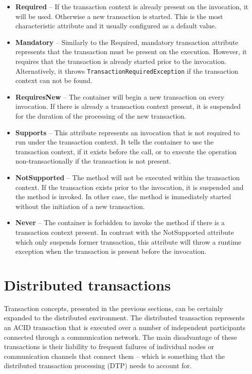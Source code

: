 \documentclass[oneside,
  digital, %
  table,   %
  nolof,     %
  nolot,     %
]{fithesis3}
\begin{document}
\begin{itemize}
    \item \textbf{Required} -- If the transaction context is already present on the invocation, it will be used. Otherwise a new transaction is started. This is the most characteristic attribute and it usually configured as a default value.
    
    \item \textbf{Mandatory} -- Similarly to the Required, mandatory transaction attribute represents that the transaction must be present on the execution. However, it requires that the transaction is already started prior to the invocation. Alternatively, it throws \texttt{TransactionRequiredException} if the transaction context can not be found.
    
    \item \textbf{RequiresNew} -- The container will begin a new transaction on every invocation. If there is already a transaction context present, it is suspended for the duration of the processing of the new transaction. 
    
    \item \textbf{Supports} -- This attribute represents an invocation that is not required to run under the transaction context. It tells the container to use the transaction context, if it exists before the call, or to execute the operation non-transactionally if the transaction is not present.
    
    \item \textbf{NotSupported} -- The method will not be executed within the transaction context. If the transaction exists prior to the invocation, it is suspended and the method is invoked. In other case, the method is immediately started without the initiation of a new transaction.
    
    \item \textbf{Never} -- The container is forbidden to invoke the method if there is a transaction context present. In contrast with the NotSupported attribute which only suspends former transaction, this attribute will throw a runtime exception when the transaction is present before the invocation.
\end{itemize}

\section{Distributed transactions}

Transaction concepts, presented in the previous sections, can be certainly expanded to the distributed environment. The distributed transaction represents an ACID transaction that is executed over a number of independent participants connected through a communication network. The main disadvantage of these transactions is their liability to frequent failures of individual nodes or communication channels that connect them -- which is something that the distributed transaction processing (DTP) needs to account for. 
\end{document}
